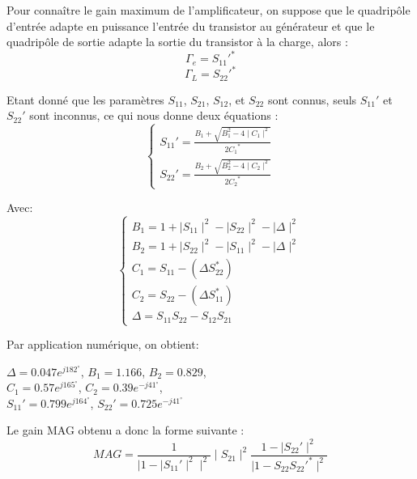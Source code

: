 \documentclass[french]{article}
\begin{document}
Pour connaître le gain maximum de l’amplificateur, on suppose que le quadripôle d’entrée adapte en puissance l’entrée du transistor au générateur et que le quadripôle de sortie adapte la sortie du transistor à la charge, alors :
\begin{equation}
	\Gamma_{e}={S_{11}}'^\ast
\end{equation}
\begin{equation}
	\Gamma_{L}={S_{22}}'^\ast
\end{equation}

Etant donné que les paramètres $S_{11}$, $S_{21}$, $S_{12}$, et $S_{22}$ sont connus, seuls ${S_{11}}'$ et ${S_{22}}'$ sont inconnus, ce qui nous donne deux équations :
\begin{equation}
	\left\{\begin{matrix}
		{S_{11}}'=\frac{B_{1}+\sqrt{B_{1}^{2}-4\mid C_{1}\mid^{2}}}{2{C_{1}}^\ast}\\
		{S_{22}}'=\frac{B_{2}+\sqrt{B_{2}^{2}-4\mid C_{2}\mid^{2}}}{2{C_{2}}^\ast}
	\end{matrix}\right.
\end{equation}

Avec:
\begin{equation}
	\left\{\begin{matrix}
		B_{1}=1+\mid S_{11}\mid^{2}-\mid S_{22}\mid^{2}-\mid \Delta \mid^{2}\\
		B_{2}=1+\mid S_{22}\mid^{2}-\mid S_{11}\mid^{2}-\mid \Delta \mid^{2}\\
		C_{1}=S_{11}-\left(\Delta S_{22}^\ast\right)\\
		C_{2}=S_{22}-\left(\Delta S_{11}^\ast\right)\\
		\Delta=S_{11}S_{22}-S_{12}S_{21}
	\end{matrix}\right.
\end{equation}

Par application numérique, on obtient:

{\centering
$\Delta=0.047e^{j182^{\circ}}$, $B_{1}=1.166$, $B_{2}=0.829$,\\ $C_{1}=0.57e^{j165^{\circ}}$, $C_{2}=0.39e^{-j41^{\circ}}$,\\ $S_{11}'=0.799e^{j164^{\circ}}$, $S_{22}'=0.725e^{-j41^{\circ}}$\\
}

Le gain MAG obtenu a donc la forme suivante :
\begin{equation}
	MAG=\frac{1}{\mid 1-\mid S_{11}'\mid^{2}\mid^{2}}\mid S_{21}\mid^{2}\frac{1-\mid S_{22}'\mid^{2}}{\mid 1-S_{22}S_{22}'^{\ast}\mid^{2}}
\end{equation}
\end{document}
